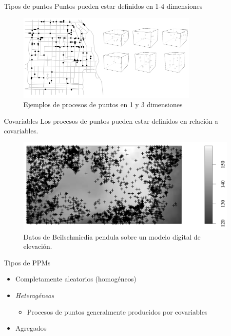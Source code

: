 \documentclass[
  11pt,
  ignorenonframetext,
]{beamer}
\providecommand{\tightlist}{%
  \setlength{\itemsep}{0pt}\setlength{\parskip}{0pt}}
\begin{document}
\begin{frame}{Tipos de puntos}
\protect\hypertarget{tipos-de-puntos-2}{}
Puntos pueden estar definidos en 1-4 dimensiones

\begin{figure}
\includegraphics[width=3.54in]{Figuras/1-3D} \caption{Ejemplos de procesos de puntos en 1 y 3 dimensiones}\label{fig:dimensiones}
\end{figure}
\end{frame}

\begin{frame}{Covariables}
\protect\hypertarget{covariables}{}
Los procesos de puntos pueden estar definidos en relación a covariables.

\begin{figure}
\includegraphics[width=4.35in]{Figuras/Covariables} \caption{Datos de Beilschmiedia pendula sobre un modelo digital de elevación.}\label{fig:covar}
\end{figure}
\end{frame}

\begin{frame}{Tipos de PPMs}
\protect\hypertarget{tipos-de-ppms}{}
\begin{itemize}
\item
  Completamente aleatorios (homogéneos)
\item
  \emph{Heterogéneos}

  \begin{itemize}
  \tightlist
  \item
    Procesos de puntos generalmente producidos por covariables
  \end{itemize}
\item
  Agregados
\end{itemize}
\end{frame}
\end{document}
